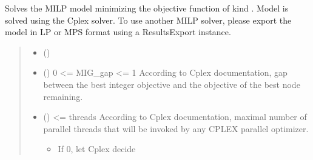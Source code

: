 \documentclass[letterpaper,10pt,english]{sphinxmanual}
\begin{document}
\begin{fulllineitems}
\begin{fulllineitems}
\label{\detokenize{generated/tamos.MILPModel:tamos.MILPModel.solve}}
\pysigstartsignatures
{}
\pysigstopsignatures
\sphinxAtStartPar
Solves the MILP model minimizing the objective function of kind .
Model is solved using the Cplex solver. To use another MILP solver, please export the model in LP or MPS format
using a ResultsExport instance.
\begin{quote}\begin{description}
\begin{itemize}
\item {} 
\sphinxAtStartPar
{} (\sphinxstyleliteralemphasis{\sphinxupquote{, }}\sphinxstyleliteralemphasis{\sphinxupquote{, }}) \textendash{} 

\item {} 
\sphinxAtStartPar
{} (\sphinxstyleliteralemphasis{\sphinxupquote{, }}\sphinxstyleliteralemphasis{\sphinxupquote{, }}) \textendash{} 0 \textless{}= MIG\_gap \textless{}= 1
According to Cplex documentation, gap between the best integer objective and the objective of the best node remaining.

\item {} 
\sphinxAtStartPar
{} (\sphinxstyleliteralemphasis{\sphinxupquote{, }}\sphinxstyleliteralemphasis{\sphinxupquote{, }}) \textendash{} 
 \textless{}= threads
According to Cplex documentation, maximal number of parallel threads that will be invoked by any CPLEX parallel optimizer.
\begin{itemize}
\item {} 
\sphinxAtStartPar
If 0, let Cplex decide


\end{itemize}
\end{itemize}
\end{description}
\end{quote}
\end{fulllineitems}
\end{fulllineitems}
\end{document}
